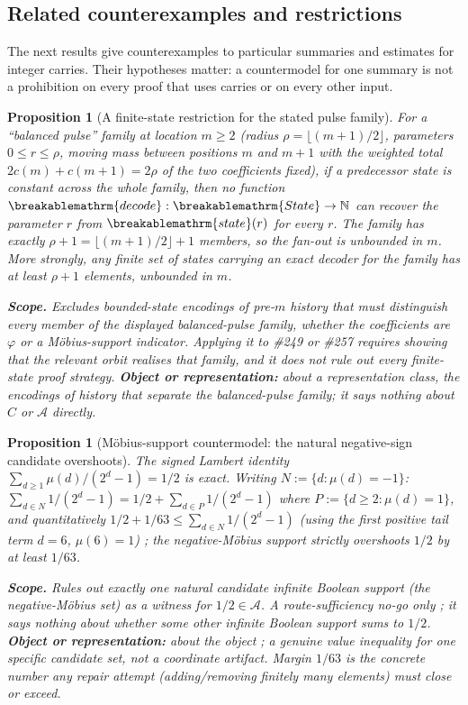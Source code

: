 \documentclass[11pt]{article}
\theoremstyle{plain}
\newtheorem{prop}[thm]{Proposition}
\theoremstyle{definition}
\theoremstyle{remark}
\renewcommand{\mathrm}[1]{\ifmmode\breakablemathrm{#1}\else\textrm{#1}\fi}%
\begin{document}
\subsection{Related counterexamples and restrictions}

The next results give counterexamples to particular summaries and
estimates for integer carries.  Their hypotheses matter: a countermodel
for one summary is not a prohibition on every proof that uses carries
or on every other input.

\begin{prop}[A finite-state restriction for the stated pulse family]
\label{prop:finite-state-nogo}
For a ``balanced pulse'' family at location $m\ge2$ (radius $\rho=\lfloor(m{+}1)/2\rfloor$, parameters
$0\le r\le\rho$, moving mass between positions $m$ and $m{+}1$ with the weighted total
$2c(m)+c(m{+}1)=2\rho$ of the two coefficients fixed), if
a predecessor state is constant across the whole family, then no function
$\mathrm{decode}:\mathrm{State}\to\mathbb N$ can recover the parameter $r$ from $\mathrm{state}(r)$
for every $r$. The family has exactly $\rho+1=\lfloor(m{+}1)/2\rfloor+1$ members, so the fan-out is
unbounded in $m$. More strongly, any finite set of states carrying an exact decoder for the family
has at least $\rho+1$ elements, unbounded in $m$.

\textbf{Scope.} Excludes bounded-state encodings of pre-$m$ history that must distinguish every
member of the displayed balanced-pulse family, whether the coefficients are $\varphi$ or a
Möbius-support indicator. Applying it to \#249 or \#257 requires showing that the relevant orbit
realises that family, and it does not rule out every finite-state proof strategy.
\textbf{Object or representation:} about a \emph{representation}
class, the encodings of history that separate the balanced-pulse family; it says nothing about $C$
or $\mathcal A$ directly.
\end{prop}

\begin{prop}[Möbius-support countermodel: the natural negative-sign candidate overshoots]
\label{prop:mobius-nogo}
The signed Lambert identity $\sum_{d\ge1}\mu(d)/(2^d-1) = 1/2$ is exact. Writing
$N:=\{d:\mu(d)=-1\}$: $\sum_{d\in N}1/(2^d-1) = 1/2 + \sum_{d\in P}1/(2^d-1)$ where $P:=\{d\ge2:
\mu(d)=1\}$, and quantitatively $1/2 + 1/63 \le \sum_{d\in N}1/(2^d-1)$ (using the first positive
tail term $d=6$, $\mu(6)=1$) ;  the negative-Möbius support strictly \emph{overshoots} $1/2$ by at
least $1/63$.

\textbf{Scope.} Rules out exactly one natural candidate infinite Boolean support (the negative-Möbius
set) as a witness for $1/2\in\mathcal A$. A route-sufficiency no-go only ;  it says nothing about
whether \emph{some other} infinite Boolean support sums to $1/2$.
\textbf{Object or representation:} about the \emph{object} ;  a genuine
value inequality for one specific candidate set, not a coordinate artifact. Margin $1/63$ is the
concrete number any repair attempt (adding/removing finitely many elements) must close or exceed.
\end{prop}
\end{document}
